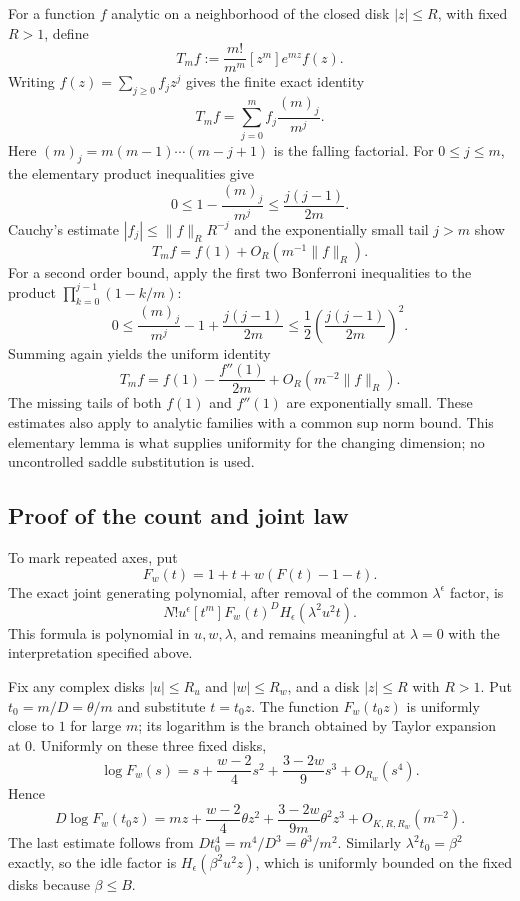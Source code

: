 \documentclass[11pt,letterpaper]{article}
\theoremstyle{remark}\newtheorem{remark}[theorem]{Remark}
\begin{document}
For a function $f$ analytic on a neighborhood of the closed disk
$|z|\leq R$, with fixed $R>1$, define
\[
 T_m f:=\frac{m!}{m^m}[z^m]e^{mz}f(z).
\]
Writing $f(z)=\sum_{j\geq0}f_jz^j$ gives the finite exact identity
\begin{equation}\label{lcw:ulb:sp:eq:transfer}
 T_m f=\sum_{j=0}^m f_j\frac{(m)_j}{m^j}.
\end{equation}
Here $(m)_j=m(m-1)\cdots(m-j+1)$ is the falling factorial.
For $0\leq j\leq m$, the elementary product inequalities give
\[
 0\leq1-\frac{(m)_j}{m^j}
 \leq\frac{j(j-1)}{2m}.
\]
Cauchy's estimate $|f_j|\leq\|f\|_R R^{-j}$ and the exponentially
small tail $j>m$ show
\begin{equation}\label{lcw:ulb:sp:eq:transfer1}
 T_m f=f(1)+O_R(m^{-1}\|f\|_R).
\end{equation}
For a second order bound, apply the first two Bonferroni inequalities
to the product $\prod_{k=0}^{j-1}(1-k/m)$:
\[
 0\leq\frac{(m)_j}{m^j}-1+\frac{j(j-1)}{2m}
 \leq\frac12\left(\frac{j(j-1)}{2m}\right)^2.
\]
Summing again yields the uniform identity
\begin{equation}\label{lcw:ulb:sp:eq:transfer2}
 T_m f=f(1)-\frac{f''(1)}{2m}
        +O_R(m^{-2}\|f\|_R).
\end{equation}
The missing tails of both $f(1)$ and $f''(1)$ are exponentially small.
These estimates also apply to analytic families with a common sup norm
bound. This elementary lemma is what supplies uniformity for the
changing dimension; no uncontrolled saddle substitution is used.

\subsection{Proof of the count and joint law}

To mark repeated axes, put
\[
 F_w(t)=1+t+w(F(t)-1-t).
\]
The exact joint generating polynomial, after removal of the common
$\lambda^\epsilon$ factor, is
\begin{equation}\label{lcw:ulb:sp:eq:marked}
 N!u^\epsilon[t^m]F_w(t)^D
 H_\epsilon(\lambda^2u^2t).
\end{equation}
This formula is polynomial in $u,w,\lambda$, and remains meaningful
at $\lambda=0$ with the interpretation specified above.

Fix any complex disks $|u|\leq R_u$ and $|w|\leq R_w$, and a disk
$|z|\leq R$ with $R>1$. Put
$t_0=m/D=\theta/m$ and substitute $t=t_0z$.
The function $F_w(t_0z)$ is uniformly close to $1$ for large $m$;
its logarithm is the branch obtained by Taylor expansion at $0$.
Uniformly on these three fixed disks,
\[
 \log F_w(s)
 =s+\frac{w-2}{4}s^2+\frac{3-2w}{9}s^3+O_{R_w}(s^4).
\]
Hence
\begin{equation}\label{lcw:ulb:sp:eq:log}
 D\log F_w(t_0z)
 =mz+\frac{w-2}{4}\theta z^2
    +\frac{3-2w}{9m}\theta^2z^3+O_{K,R,R_w}(m^{-2}).
\end{equation}
The last estimate follows from
$Dt_0^4=m^4/D^3=\theta^3/m^2$.
Similarly $\lambda^2t_0=\beta^2$ exactly, so the idle factor is
$H_\epsilon(\beta^2u^2z)$, which is uniformly bounded on the
fixed disks because $\beta\leq B$.
\end{document}
